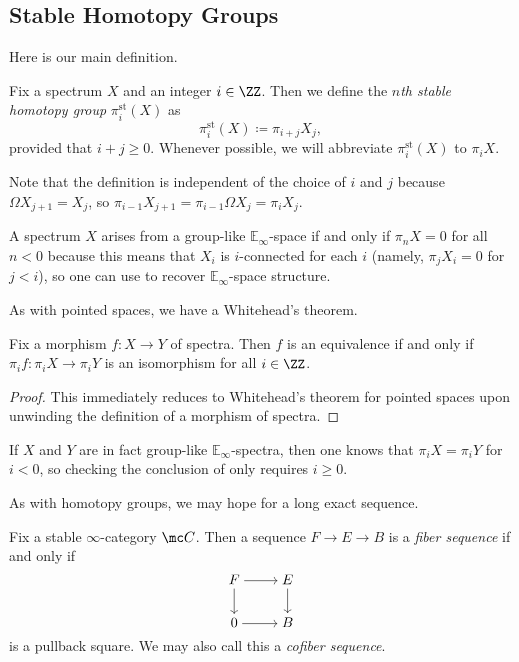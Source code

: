 \documentclass[../notes.tex]{subfiles}
\begin{document}
\subsection{Stable Homotopy Groups}
Here is our main definition.
\begin{definition}
	Fix a spectrum $X$ and an integer $i\in\ZZ$. Then we define the \textit{$n$th stable homotopy group} $\pi_i^{\mathrm{st}}(X)$ as
	\[\pi_i^{\mathrm{st}}(X)\coloneqq\pi_{i+j}X_j,\]
	provided that $i+j\ge0$. Whenever possible, we will abbreviate $\pi_i^{\mathrm{st}}(X)$ to $\pi_iX$.
\end{definition}
\begin{remark}
	Note that the definition is independent of the choice of $i$ and $j$ because $\Omega X_{j+1}=X_{j}$, so $\pi_{i-1}X_{j+1}=\pi_{i-1}\Omega X_j=\pi_iX_j$.
\end{remark}
\begin{remark}
	A spectrum $X$ arises from a group-like $\mathbb E_\infty$-space if and only if $\pi_nX=0$ for all $n<0$ because this means that $X_i$ is $i$-connected for each $i$ (namely, $\pi_jX_i=0$ for $j<i$), so one can use  to recover $\mathbb E_\infty$-space structure.
\end{remark}
As with pointed spaces, we have a Whitehead's theorem.
\begin{theorem} \label{thm:whitehead-spectra}
	Fix a morphism $f\colon X\to Y$ of spectra. Then $f$ is an equivalence if and only if $\pi_if\colon\pi_iX\to\pi_iY$ is an isomorphism for all $i\in\ZZ$.
\end{theorem}
\begin{proof}
	This immediately reduces to Whitehead's theorem for pointed spaces upon unwinding the definition of a morphism of spectra.
\end{proof}
\begin{remark}
	If $X$ and $Y$ are in fact group-like $\mathbb E_\infty$-spectra, then one knows that $\pi_iX=\pi_iY$ for $i<0$, so checking the conclusion of  only requires $i\ge0$.
\end{remark}
As with homotopy groups, we may hope for a long exact sequence.
\begin{definition}
	Fix a stable $\infty$-category $\mc C$. Then a sequence $F\to E\to B$ is a \textit{fiber sequence} if and only if
	\[\begin{tikzcd}[cramped]
		F & E \\
		0 & B
		\arrow[from=1-1, to=1-2]
		\arrow[from=1-1, to=2-1]
		\arrow[from=1-2, to=2-2]
		\arrow[from=2-1, to=2-2]
	\end{tikzcd}\]
	is a pullback square. We may also call this a \textit{cofiber sequence}.
\end{definition}
\end{document}
